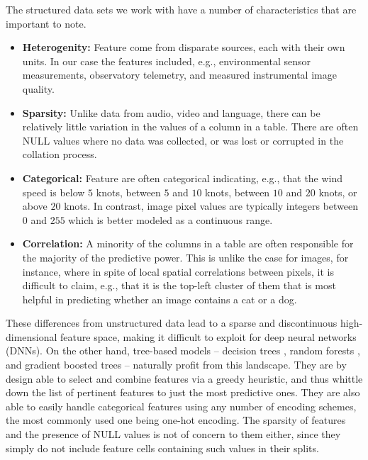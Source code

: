 The structured data sets we work with have a number of characteristics that are important to note.
\begin{itemize}
    \item {\bf Heterogenity:}  Feature come from disparate sources, each with their own units. In our case the features included, e.g., environmental sensor measurements, observatory telemetry, and measured instrumental image quality.
    \item {\bf Sparsity:} Unlike data from audio, video and language, there can be relatively little variation in the values of a column in a table. There are often NULL values where no data was collected, or was lost or corrupted in the collation process. 
    \item {\bf Categorical:}  Feature are often categorical indicating, e.g., that the wind speed is below $5$ knots, between $5$ and $10$ knots, between $10$ and $20$ knots, or above $20$ knots.  In contrast, image pixel values are typically integers between $0$ and $255$ which is better modeled as a continuous range.
    \item {\bf Correlation:}  A minority of the columns in a table are often responsible for the majority of the predictive power. This is unlike the case for images, for instance, where in spite of local spatial correlations between pixels, it is difficult to claim, e.g., that it is the top-left cluster of them that is most helpful in predicting whether an image contains a cat or a dog. 
\end{itemize}

These differences from unstructured data lead to a sparse and discontinuous high-dimensional feature space, making it difficult to exploit for deep neural networks (DNNs). On the other hand, tree-based models -- decision trees \citep{decision_trees}, random forests \citep{randomforests}, and gradient boosted trees \citep{xgboost, lightgbm} -- naturally profit from this landscape. They are by design able to select and combine features via a greedy heuristic, and thus whittle down the list of pertinent features to just the most predictive ones. They are also able to easily handle categorical features using any number of encoding schemes, the most commonly used one being one-hot encoding. The sparsity of features and the presence of NULL values is not of concern to them either, since they simply do not include feature cells containing such values in their splits.

